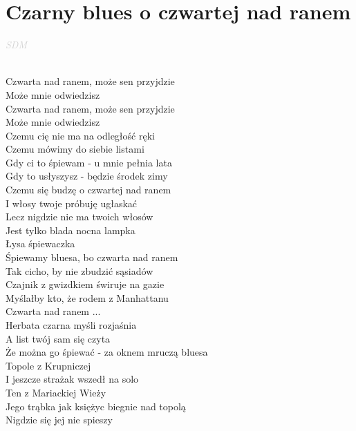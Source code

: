 \documentclass[a5paper, 10pt]{book}
\begin{document}
\section{Czarny blues o czwartej nad ranem}\textcolor{lightgray}{\textit{SDM}}\\~\\
\begin{minipage}[t]{0.7\textwidth}

\hspace*{4mm} Czwarta nad ranem, może sen przyjdzie\\
\hspace*{4mm} Może mnie odwiedzisz\\
\hspace*{4mm} Czwarta nad ranem, może sen przyjdzie\\
\hspace*{4mm} Może mnie odwiedzisz\\

Czemu cię nie ma na odległość ręki\\
Czemu mówimy do siebie listami\\
Gdy ci to śpiewam - u mnie pełnia lata\\
Gdy to usłyszysz - będzie środek zimy\\

Czemu się budzę o czwartej nad ranem\\
I włosy twoje próbuję ugłaskać\\
Lecz nigdzie nie ma twoich włosów\\
Jest tylko blada nocna lampka\\
Łysa śpiewaczka\\

Śpiewamy bluesa, bo czwarta nad ranem\\
Tak cicho, by nie zbudzić sąsiadów\\
Czajnik z gwizdkiem świruje na gazie\\
Myślałby kto, że rodem z Manhattanu\\

\hspace*{4mm} Czwarta nad ranem ... \\

Herbata czarna myśli rozjaśnia\\
A list twój sam się czyta\\
Że można go śpiewać - za oknem mruczą bluesa\\
Topole z Krupniczej\\

I jeszcze strażak wszedł na solo\\
Ten z Mariackiej Wieży\\
Jego trąbka jak księżyc biegnie nad topolą\\
Nigdzie się jej nie spieszy\\


\end{minipage}
\end{document}
